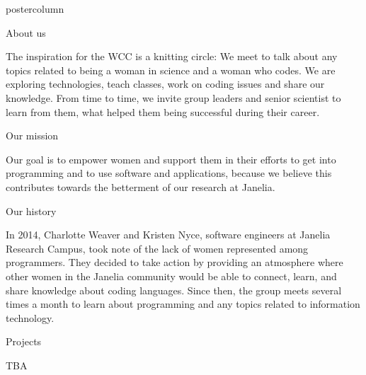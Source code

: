 \documentclass{beamer}
\begin{document}
\begin{frame}
\begin{columns}
\begin{column}{.33\textwidth}
\begin{beamercolorbox}[center,wd=\textwidth]{postercolumn}
\begin{minipage}[T]{.95\textwidth}
{\begin{myblock}{About us}
\begin{addmargin}[1em]{1em}
                            The inspiration for the WCC is a knitting circle: We meet to talk about any topics related to being a woman in science and a woman who codes.
                            We are exploring technologies, teach classes, work on coding issues and share our knowledge.\newline
                            From time to time, we invite group leaders and senior scientist to learn from them, what helped them being successful during their career.
                        \end{addmargin}
                    \end{myblock}
                    \vspace{1.25cm}
                    \begin{myblock}{Our mission}
                        \begin{addmargin}[1em]{1em}
                            Our goal is to empower women and support them in
their efforts to get into programming and to use software and applications, because we believe this contributes
                            towards the betterment of our research at Janelia.
                        \end{addmargin}
                    \end{myblock}
                    \vspace{1.25cm}
                    \begin{myblock}{Our history}
                        \begin{addmargin}[1em]{1em}
                            In 2014, Charlotte Weaver and Kristen Nyce, software engineers at Janelia Research Campus, took note of the lack of women represented among programmers. They decided to take action by providing an atmosphere where other women in the Janelia community would be able to connect, learn, and share knowledge about coding languages.\newline
                            Since then, the group meets several times a month to learn about programming and any topics related to information technology.
                        \end{addmargin}
                    \end{myblock}
                    \vspace{1.25cm}
                    \begin{myblock}{Projects}
                        \begin{addmargin}[1em]{1em}
                            TBA
                        \end{addmargin}

\end{myblock}}
\end{minipage}
\end{beamercolorbox}
\end{column}
\end{columns}
\end{frame}
\end{document}
